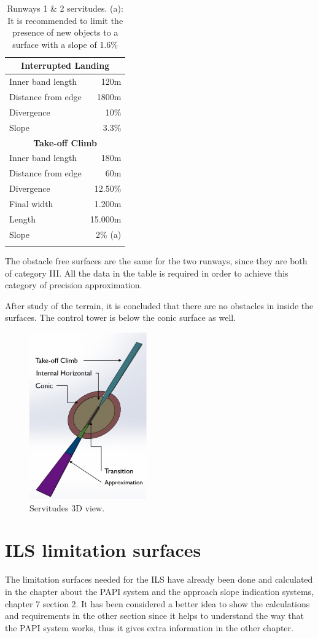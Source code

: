 \begin{longtable}[htb]{@{}lr@{}}
		\multicolumn{2}{c}{\textbf{Interrupted Landing} }\\
		\midrule[0.5pt]
		Inner band length & 120m\\
		Distance from edge & 1800m\\
		Divergence & 10\%\\
		Slope & 3.3\%\\
		\midrule[2pt]
		\multicolumn{2}{c}{\textbf{Take-off Climb} }\\
		\midrule[0.5pt]
		Inner band length & 180m\\
		Distance from edge & 60m\\
		Divergence & 12.50\%\\
		Final width & 1.200m\\
		Length & 15.000m\\
		Slope & 2\% (a)\\
		\bottomrule[3pt]
		\caption{Runways 1 \& 2 servitudes. (a): It is recommended to limit the presence of new objects to a surface with a slope of 1.6\%}
	\end{longtable}
	
	The obstacle free surfaces are the same for the two runways, since they are both of category III. All the data in the table is required in order to achieve this category of precision approximation.
	
	After study of the terrain, it is concluded that there are no obstacles in inside the surfaces. The control tower is below the conic surface as well.
	
	
	\begin{figure}[H]
		\centering
		\includegraphics[clip, trim=0cm 0cm 0cm 0cm, width=0.45\textwidth]{./images/servidumbres/3Dservidumbres}
		\caption{Servitudes 3D view.}
		\label{3Dservidumbres}
	\end{figure}

	
	\section{ILS limitation surfaces}
		The limitation surfaces needed for the ILS have already been done and calculated in the chapter about the PAPI system and the approach slope indication systems, chapter 7 section 2. It has been considered a better idea to show the calculations and requirements in the other section since it helps to understand the way that the PAPI system works, thus it gives extra information in the other chapter. 